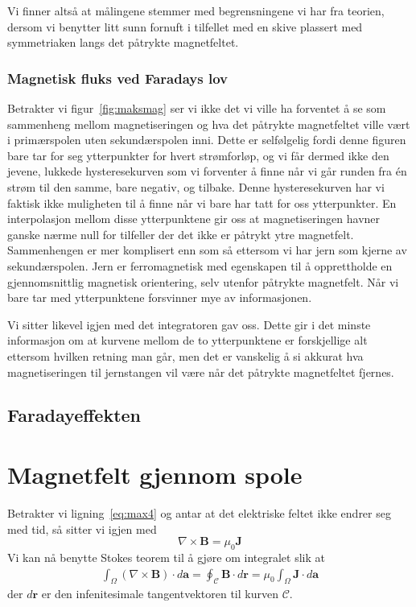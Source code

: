 \documentclass[a4paper,11pt, twocolumn]{article}
\begin{document}
Vi finner altså at målingene stemmer med begrensningene vi har fra teorien, dersom vi benytter litt sunn fornuft i tilfellet med en skive plassert med symmetriaken langs det påtrykte magnetfeltet.
\subsubsection{Magnetisk fluks ved Faradays lov}
Betrakter vi figur~\ref{fig:maksmag} ser vi ikke det vi ville ha forventet å se som sammenheng mellom magnetiseringen og hva det påtrykte magnetfeltet ville vært i primærspolen uten sekundærspolen inni. Dette er selfølgelig fordi denne figuren bare tar for seg ytterpunkter for hvert strømforløp, og vi får dermed ikke den jevene, lukkede hysteresekurven som vi forventer å finne når vi går runden fra \'en strøm til den samme, bare negativ, og tilbake. Denne hysteresekurven har vi faktisk ikke muligheten til å finne når vi bare har tatt for oss ytterpunkter. En interpolasjon mellom disse ytterpunktene gir oss at magnetiseringen havner ganske nærme null for tilfeller der det ikke er påtrykt ytre magnetfelt. Sammenhengen er mer komplisert enn som så ettersom vi har jern som kjerne av sekundærspolen. Jern er ferromagnetisk med egenskapen til å opprettholde en gjennomsnittlig magnetisk orientering, selv utenfor påtrykte magnetfelt. Når vi bare tar med ytterpunktene forsvinner mye av informasjonen. 

Vi sitter likevel igjen med det integratoren gav oss. Dette gir i det minste informasjon om at kurvene mellom de to ytterpunktene er forskjellige alt ettersom hvilken retning man går, men det er vanskelig å si akkurat hva magnetiseringen til jernstangen vil være når det påtrykte magnetfeltet fjernes. 


\printbibliography
\onecolumn
\appendix


\subsection{Faradayeffekten}
\section{Magnetfelt gjennom spole}
\label{app:magspole}
Betrakter vi ligning~\eqref{eq:max4} og antar at det elektriske feltet ikke endrer seg med tid, så sitter vi igjen med 
\begin{equation}
	\nabla\times\mathbf{B} = \mu_0\mathbf{J}
	\label{eq:independentOfTime}
\end{equation}
Vi kan nå benytte Stokes teorem til å gjøre om integralet slik at
\begin{align}
	\int_\Omega (\nabla\times\mathbf{B})\cdot d\mathbf{a} = \oint_\mathcal{C}\mathbf{B}\cdot d\mathbf{r}=\mu_0\int_\Omega \mathbf{J} \cdot d\mathbf{a} 
	\label{}
\end{align}
der $d\mathbf{r}$ er den infenitesimale tangentvektoren til kurven $\mathcal{C}$. 
\end{document}
